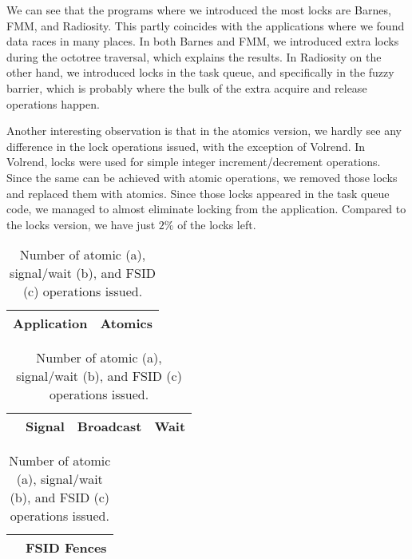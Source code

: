 We can see that the programs where we introduced the most locks are Barnes, FMM,
and Radiosity. This partly coincides with the applications where we found data
races in many places. In both Barnes and FMM, we introduced extra locks during
the octotree traversal, which explains the results. In Radiosity on the other
hand, we introduced locks in the task queue, and specifically in the fuzzy
barrier, which is probably where the bulk of the extra acquire and release
operations happen.

Another interesting observation is that in the atomics version, we hardly see
any difference in the lock operations issued, with the exception of Volrend. In
Volrend, locks were used for simple integer increment/decrement operations.
Since the same can be achieved with atomic operations, we removed those locks
and replaced them with atomics. Since those locks appeared in the task queue
code, we managed to almost eliminate locking from the application. Compared to
the locks version, we have just $2\%$ of the locks left.

\begin{table}
	\begin{centering}
		\begin{subtable}{0.35\textwidth}
			\begin{tabular}{ r | r }
				Application & Atomics \\
				\hline
			\end{tabular}
			\caption{Atomic operations}
			\label{tab:atomics}
		\end{subtable}
		\begin{subtable}{0.415\textwidth}
			\begin{tabular}{ r | r r r }
				& Signal & Broadcast & Wait \\
				\hline
			\end{tabular}
			\caption{Signal/wait operations}
			\label{tab:signal}
		\end{subtable}
		\begin{subtable}{0.18\textwidth}
			\begin{tabular}{ r | r }
				& FSID Fences \\
				\hline
			\end{tabular}
			\caption{FSID Fences}
			\label{tab:fsid}
		\end{subtable}
	\end{centering}
	\caption{Number of atomic (a), signal/wait (b), and FSID (c) operations
		issued.}
\end{table}

